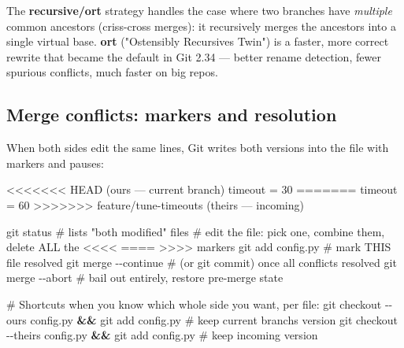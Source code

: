 \documentclass[11pt]{article}
\newenvironment{Shaded}{\begin{snugshade}}{\end{snugshade}}
\newcommand{\AttributeTok}[1]{\textcolor[rgb]{0.16,0.50,0.73}{#1}}
\newcommand{\CommentTok}[1]{\textcolor[rgb]{0.48,0.49,0.49}{#1}}
\newcommand{\DecValTok}[1]{\textcolor[rgb]{0.96,0.45,0.00}{#1}}
\newcommand{\FunctionTok}[1]{\textcolor[rgb]{0.56,0.27,0.68}{#1}}
\newcommand{\KeywordTok}[1]{\textcolor[rgb]{0.81,0.81,0.76}{\textbf{#1}}}
\newcommand{\NormalTok}[1]{\textcolor[rgb]{0.81,0.81,0.76}{#1}}
\newcommand{\OperatorTok}[1]{\textcolor[rgb]{0.81,0.81,0.76}{#1}}
\begin{document}
The \textbf{recursive/ort} strategy handles the case where two branches have \emph{multiple} common ancestors (criss-cross merges): it recursively merges the ancestors into a single virtual base. \textbf{ort} ("Ostensibly Recursive\textquotesingle s Twin") is a faster, more correct rewrite that became the default in Git 2.34 --- better rename detection, fewer spurious conflicts, much faster on big repos.

\subsection{Merge conflicts: markers and resolution}\label{merge-conflicts-markers-and-resolution}

When both sides edit the same lines, Git writes both versions into the file with markers and pauses:


\begin{Shaded}
\begin{Highlighting}[]
\OperatorTok{\textless{}\textless{}\textless{}\textless{}\textless{}\textless{}\textless{}}\NormalTok{ HEAD (ours — current branch)}
\NormalTok{timeout }\OperatorTok{=} \DecValTok{30}
\OperatorTok{=======}
\NormalTok{timeout }\OperatorTok{=} \DecValTok{60}
\OperatorTok{\textgreater{}\textgreater{}\textgreater{}\textgreater{}\textgreater{}\textgreater{}\textgreater{}}\NormalTok{ feature}\OperatorTok{/}\NormalTok{tune}\OperatorTok{{-}}\NormalTok{timeouts (theirs — incoming)}
\end{Highlighting}
\end{Shaded}


\begin{Shaded}
\begin{Highlighting}[]
\FunctionTok{git}\NormalTok{ status                 }\CommentTok{\# lists "both modified" files}
\CommentTok{\# edit the file: pick one, combine them, delete ALL the \textless{}\textless{}\textless{}\textless{} ==== \textgreater{}\textgreater{}\textgreater{}\textgreater{} markers}
\FunctionTok{git}\NormalTok{ add config.py          }\CommentTok{\# mark THIS file resolved}
\FunctionTok{git}\NormalTok{ merge }\AttributeTok{{-}{-}continue}       \CommentTok{\# (or git commit) once all conflicts resolved}
\FunctionTok{git}\NormalTok{ merge }\AttributeTok{{-}{-}abort}          \CommentTok{\# bail out entirely, restore pre{-}merge state}

\CommentTok{\# Shortcuts when you know which whole side you want, per file:}
\FunctionTok{git}\NormalTok{ checkout }\AttributeTok{{-}{-}ours}\NormalTok{   config.py }\KeywordTok{\&\&} \FunctionTok{git}\NormalTok{ add config.py   }\CommentTok{\# keep current branch\textquotesingle{}s version}
\FunctionTok{git}\NormalTok{ checkout }\AttributeTok{{-}{-}theirs}\NormalTok{ config.py }\KeywordTok{\&\&} \FunctionTok{git}\NormalTok{ add config.py   }\CommentTok{\# keep incoming version}
\end{Highlighting}
\end{Shaded}
\end{document}

